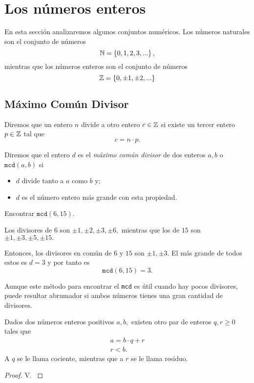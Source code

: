\section{Los números enteros}
	
	En esta sección analizaremos algunos conjuntos numéricos. 
	Los números naturales son el conjunto de números
	$$
	\mathbb{N}=\left\{ 0,1,2,3,... \right\},
	$$	
	mientras que los números enteros son el conjunto de números
	$$
	\mathbb{Z}=\left\{ 0, \pm1, \pm2,... \right\}	$$	


\subsection{Máximo Común Divisor}
	
\begin{defn}
	Diremos que un entero $n$ divide a otro entero $c\in \mathbb{Z}$ si existe un tercer entero $p\in \mathbb{Z}$ tal que 
	$$c=n\cdot p.$$
\end{defn}

\begin{defn}
	\label{mcd} 
	Diremos que el entero $d$ es el \emph{máximo común divisor} de dos enteros $a,b$ o $\texttt{mcd}(a,b)$  si
	\begin{itemize}
		\item $d$ divide tanto a $a$ como $b$ y;
		\item $d$ es el número entero más grande con esta propiedad.
	\end{itemize}
\end{defn}

	\begin{problema}
		\label{exmp:mcd}
		Encontrar $\texttt{mcd}(6,15).$
	\end{problema}
		
	\begin{sol}
		Los divisores de $6$ son $\pm1, \pm2, \pm3, \pm6,$ mientras que los de $15$ son $\pm1, \pm3, \pm5, \pm15.$
		 		
		Entonces, los divisores en común de $6$ y $15$ son $\pm1,\pm3.$ El más grande de todos estos es 
		$d=3$ y por tanto es $$ \texttt{mcd}(6,15)=3. $$
	\end{sol}
	
 	Aunque este m\'etodo para encontrar el \texttt{mcd} es útil cuando hay pocos divisores, puede resultar abrumador si  	ambos números tienes una gran cantidad de divisores. 
   
	\begin{prop}
		Dados dos números enteros positivos $a,b,$ existen otro par de enteros $q, r\geq 0$ tales que
		\begin{align}
			\label{cociente}
			a=b\cdot q+r\\
			\label{residuo}
			r<b.
		\end{align}
		A $q$ se le llama cociente, mientras que a $r$ se le llama residuo.
	\end{prop}
	\begin{proof}
		V. \cite[sección 7.2, teorema1]{cardenas1973algebra}
	\end{proof}


